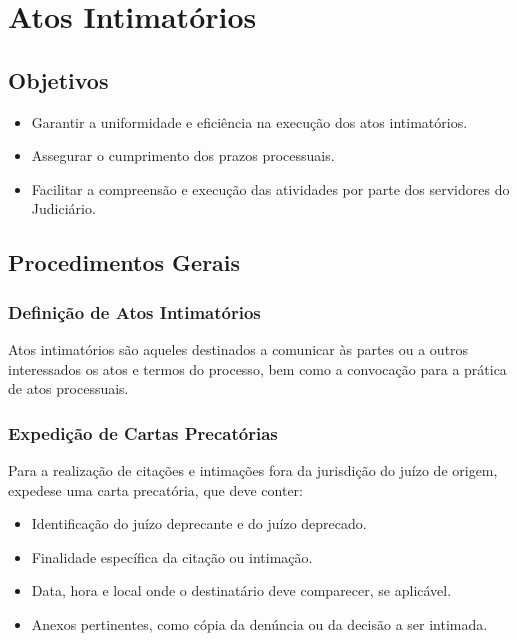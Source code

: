 \documentclass[letterpaper,10pt,brazil]{sphinxmanual}
\begin{document}
\sphinxstepscope


\section{Atos Intimatórios}
\label{\detokenize{06atosintimatorios:atos-intimatorios}}\label{\detokenize{06atosintimatorios::doc}}

\subsection{Objetivos}
\label{\detokenize{06atosintimatorios:objetivos}}\begin{itemize}
\item {} 
\sphinxAtStartPar
Garantir a uniformidade e eficiência na execução dos atos intimatórios.

\item {} 
\sphinxAtStartPar
Assegurar o cumprimento dos prazos processuais.

\item {} 
\sphinxAtStartPar
Facilitar a compreensão e execução das atividades por parte dos servidores do Judiciário.

\end{itemize}


\subsection{Procedimentos Gerais}
\label{\detokenize{06atosintimatorios:procedimentos-gerais}}

\subsubsection{Definição de Atos Intimatórios}
\label{\detokenize{06atosintimatorios:definicao-de-atos-intimatorios}}
\sphinxAtStartPar
Atos intimatórios são aqueles destinados a comunicar às partes ou a outros interessados os atos e termos do processo, bem como a convocação para a prática de atos processuais.


\subsubsection{Expedição de Cartas Precatórias}
\label{\detokenize{06atosintimatorios:expedicao-de-cartas-precatorias}}
\sphinxAtStartPar
Para a realização de citações e intimações fora da jurisdição do juízo de origem, expede\sphinxhyphen{}se uma carta precatória, que deve conter:
\begin{itemize}
\item {} 
\sphinxAtStartPar
Identificação do juízo deprecante e do juízo deprecado.

\item {} 
\sphinxAtStartPar
Finalidade específica da citação ou intimação.

\item {} 
\sphinxAtStartPar
Data, hora e local onde o destinatário deve comparecer, se aplicável.

\item {} 
\sphinxAtStartPar
Anexos pertinentes, como cópia da denúncia ou da decisão a ser intimada.

\end{itemize}
\end{document}

